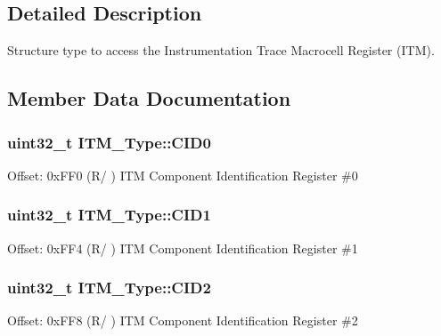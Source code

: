 \subsection{Detailed Description}
Structure type to access the Instrumentation Trace Macrocell Register (I\+TM). 

\subsection{Member Data Documentation}
\subsubsection[{\texorpdfstring{C\+I\+D0}{CID0}}]{ uint32\+\_\+t I\+T\+M\+\_\+\+Type\+::\+C\+I\+D0}\hypertarget{struct_i_t_m___type_a413f3bb0a15222e5f38fca4baeef14f6}{}\label{struct_i_t_m___type_a413f3bb0a15222e5f38fca4baeef14f6}
Offset\+: 0x\+F\+F0 (R/ ) I\+TM Component Identification Register \#0 
\subsubsection[{\texorpdfstring{C\+I\+D1}{CID1}}]{ uint32\+\_\+t I\+T\+M\+\_\+\+Type\+::\+C\+I\+D1}\hypertarget{struct_i_t_m___type_a5f7d524b71f49e444ff0d1d52b3c3565}{}\label{struct_i_t_m___type_a5f7d524b71f49e444ff0d1d52b3c3565}
Offset\+: 0x\+F\+F4 (R/ ) I\+TM Component Identification Register \#1 
\subsubsection[{\texorpdfstring{C\+I\+D2}{CID2}}]{ uint32\+\_\+t I\+T\+M\+\_\+\+Type\+::\+C\+I\+D2}\hypertarget{struct_i_t_m___type_adee4ccce1429db8b5db3809c4539f876}{}\label{struct_i_t_m___type_adee4ccce1429db8b5db3809c4539f876}
Offset\+: 0x\+F\+F8 (R/ ) I\+TM Component Identification Register \#2 
